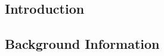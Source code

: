 \begin{multicols}{2}
    \tableofcontents
    \section{Introduction}
    \subsection{Background Information}

\end{multicols}
